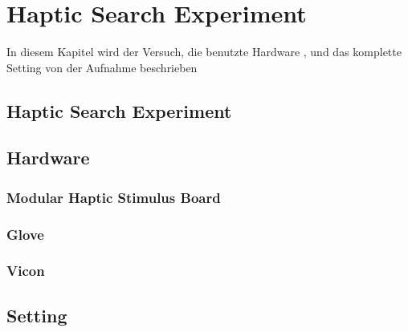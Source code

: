 
\chapter{Haptic Search Experiment} %

\label{Haptic Search Experiment} %



\begin{text}
In diesem Kapitel wird der Versuch, die benutzte Hardware , und das komplette Setting von der Aufnahme beschrieben
\end{text}
\section{Haptic Search Experiment}

\section{Hardware}

\subsection{Modular Haptic Stimulus Board}
\subsection{Glove}
\subsection{Vicon}

\section{Setting}